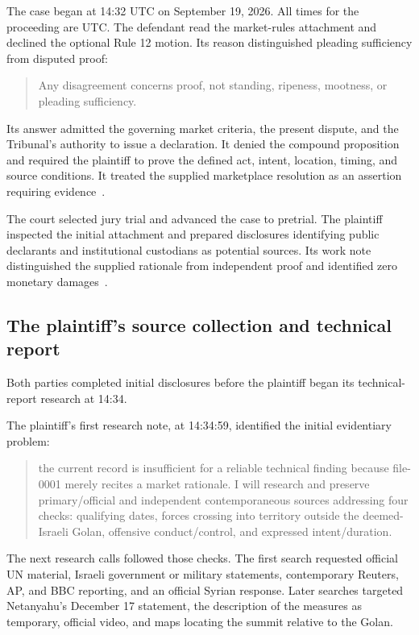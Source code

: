 \documentclass[11pt]{article}
\begin{document}
The case began at 14:32 UTC on September 19, 2026.  All times for the proceeding are UTC.  The defendant read the market-rules attachment and declined the optional Rule 12 motion.  Its reason distinguished pleading sufficiency from disputed proof:
\begin{quote}
Any disagreement concerns proof, not standing, ripeness, mootness, or pleading sufficiency.
\end{quote}
Its answer admitted the governing market criteria, the present dispute, and the Tribunal's authority to issue a declaration.  It denied the compound proposition and required the plaintiff to prove the defined act, intent, location, timing, and source conditions.  It treated the supplied marketplace resolution as an assertion requiring evidence~\cite[events 1--3]{record}.

The court selected jury trial and advanced the case to pretrial.  The plaintiff inspected the initial attachment and prepared disclosures identifying public declarants and institutional custodians as potential sources.  Its work note distinguished the supplied rationale from independent proof and identified zero monetary damages~\cite[events 4--6 and plaintiff work notes at 14:33:51--14:34:10]{record}.

\subsection{The plaintiff's source collection and technical report}

Both parties completed initial disclosures before the plaintiff began its technical-report research at 14:34.

The plaintiff's first research note, at 14:34:59, identified the initial evidentiary problem:
\begin{quote}
the current record is insufficient for a reliable technical finding because file-0001 merely recites a market rationale.  I will research and preserve primary/official and independent contemporaneous sources addressing four checks: qualifying dates, forces crossing into territory outside the deemed-Israeli Golan, offensive conduct/control, and expressed intent/duration.
\end{quote}
The next research calls followed those checks.  The first search requested official UN material, Israeli government or military statements, contemporary Reuters, AP, and BBC reporting, and an official Syrian response.  Later searches targeted Netanyahu's December 17 statement, the description of the measures as temporary, official video, and maps locating the summit relative to the Golan.
\end{document}
